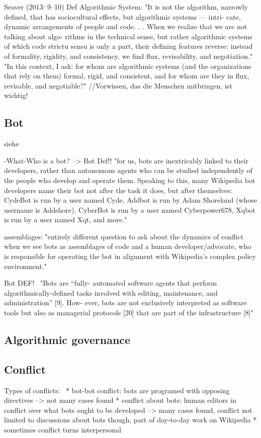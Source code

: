 \documentclass[pdftex,a4paper,11pt]{scrartcl}
\begin{document}
Seaver (2013: 9–10) Def Algorithmic System:
"It is not the algorithm, narrowly defined, that has
sociocultural effects, but algorithmic systems — intri-
cate, dynamic arrangements of people and code. . .
When we realize that we are not talking about algo-
rithms in the technical sense, but rather algorithmic
systems of which code strictu sensu is only a part,
their defining features reverse: instead of formality,
rigidity, and consistency, we find flux, revisability,
and negotiation."
"In this context, I ask: for whom are algorithmic systems
(and the organizations that rely on them) formal, rigid,
and consistent, and for whom are they in flux, revisable,
and negotiable?" //Vorwissen, das die Menschen mitbringen, ist wichtig!~\cite{Geiger2017}

\subsection{Bot}
siehe ~\cite{GeiHal2017}

-What-Who is a bot? --> Bot Def!!
"for us, bots are inextricably linked to their developers, rather than autonomous agents who can
be studied independently of the people who develop and operate them. Speaking to this, many
Wikipedia bot developers name their bot not after the task it does, but after themselves: CydeBot
is run by a user named Cyde, Addbot is run by Adam Shoreland (whose username is Addshore),
CyberBot is run by a user named Cyberpower678, Xqbot is run by a user named Xqt, and more."

assemblages:
"entirely different question to ask about the dynamics of conflict
when we see bots as assemblages of code and a human developer/advocate, who is responsible for
operating the bot in alignment with Wikipedia’s complex policy environment."

Bot DEF!~\cite{MueDoHer2013}
"Bots are “fully-
automated software agents that perform algorithmically-defined tasks
involved with editing, maintenance, and administration” [9]. How-
ever, bots are not exclusively interpreted as software tools but also
as managerial protocols [20] that are part of the infrastructure [8]"
\subsection{Algorithmic governance}

\subsection{Conflict}
Types of conflicts:~\cite{GeiHal2017}
* bot-bot conflict: bots are programed with opposing directives --> not many cases found
* conflict about bots: human editors in conflict over what bots ought to be developed --> many cases found, conflict not limited to discussions about bots though, part of day-to-day work on Wikipedia
* sometimes conflict turns interpersonal
\end{document}
